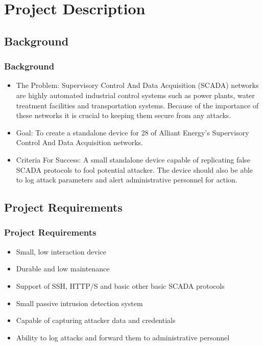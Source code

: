 \section{Project Description}

\subsection{Background}
\begin{frame}
\frametitle{Background}

\begin{itemize} %
\item The Problem:  Supervisory Control And Data Acquisition (SCADA) networks are    highly automated industrial control systems such as power plants, water treatment  facilities and transportation systems.  Because of the importance of these networks  it is crucial to keeping them secure from any attacks.
\item Goal: To create a standalone device for 28 of Alliant Energy's Supervisory Control  And Data Acquisition networks.
\item Criteria For Success:  A small standalone device capable of replicating false  SCADA protocols to fool potential attacker.  The device should also be able to log  attack parameters and alert administrative personnel for action.
\end{itemize}

\end{frame}

\subsection{Project Requirements}
\begin{frame}
\frametitle{Project Requirements}

\begin{itemize}
\item Small, low interaction device
\item Durable and low maintenance
\item Support of SSH, HTTP/S and basic other basic SCADA protocols
\item Small passive intrusion detection system
\item Capable of capturing attacker data and credentials
\item Ability to log attacks and forward them to administrative personnel
\end{itemize}

\end{frame}
